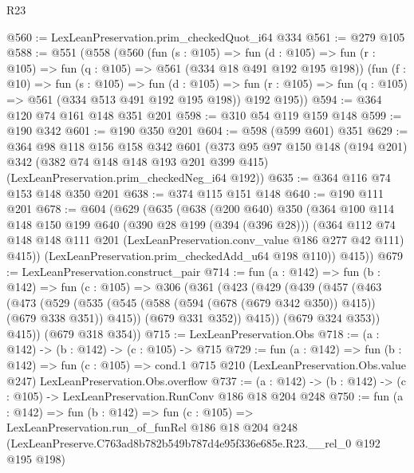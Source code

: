 \begin{lexlean}{R23}
\begin{coremodule}
@560 := LexLeanPreservation.prim_checkedQuot_i64 @334
@561 := @279 @105
@588 := @551
    (@558
      (@560
        (fun (s : @105) =>
        fun (d : @105) => fun (r : @105) => fun (q : @105) => @561 (@334 @18 @491 @192 @195 @198))
        (fun (f : @10) =>
        fun (s : @105) =>
        fun (d : @105) => fun (r : @105) => fun (q : @105) => @561 (@334 @513 @491 @192 @195 @198))
        @192
        @195))
@594 := @364 @120 @74 @161 @148 @351 @201
@598 := @310 @54 @119 @159 @148
@599 := @190 @342
@601 := @190 @350 @201
@604 := @598 (@599 @601) @351
@629 := @364
    @98
    @118
    @156
    @158
    @342
    @601
    (@373
      @95
      @97
      @150
      @148
      (@194 @201)
      @342
      (@382 @74 @148 @148 @193 @201 @399 @415)
      (LexLeanPreservation.prim_checkedNeg_i64 @192))
@635 := @364 @116 @74 @153 @148 @350 @201
@638 := @374 @115 @151 @148
@640 := @190 @111 @201
@678 := @604
    (@629
      (@635
        (@638
          (@200 @640)
          @350
          (@364
            @100
            @114
            @148
            @150
            @199
            @640
            (@390 @28 @199 (@394 (@396 @28)))
            (@364
              @112
              @74
              @148
              @148
              @111
              @201
              (LexLeanPreservation.conv_value @186 @277 @42 @111)
              @415))
          (LexLeanPreservation.prim_checkedAdd_u64 @198 @110))
        @415))
@679 := LexLeanPreservation.construct_pair
@714 := fun (a : @142) =>
  fun (b : @142) =>
  fun (c : @105) =>
  @306
    (@361
      (@423
        (@429
          (@439
            (@457
              (@463
                (@473
                  (@529
                    (@535 (@545 (@588 (@594 (@678 (@679 @342 @350)) @415)) (@679 @338 @351)) @415))
                  (@679 @331 @352))
                @415))
            (@679 @324 @353))
          @415))
      (@679 @318 @354))
@715 := LexLeanPreservation.Obs
@718 := (a : @142) -> (b : @142) -> (c : @105) -> @715
@729 := fun (a : @142) =>
  fun (b : @142) =>
  fun (c : @105) =>
  cond.{1} @715 @210 (LexLeanPreservation.Obs.value @247) LexLeanPreservation.Obs.overflow
@737 := (a : @142) -> (b : @142) -> (c : @105) -> LexLeanPreservation.RunConv @186 @18 @204 @248
@750 := fun (a : @142) =>
  fun (b : @142) =>
  fun (c : @105) =>
  LexLeanPreservation.run_of_funRel
    @186
    @18
    @204
    @248
    (LexLeanPreserve.C763ad8b782b549b787d4e95f336e685e.R23.__rel_0 @192 @195 @198)
\end{coremodule}
\end{lexlean}
